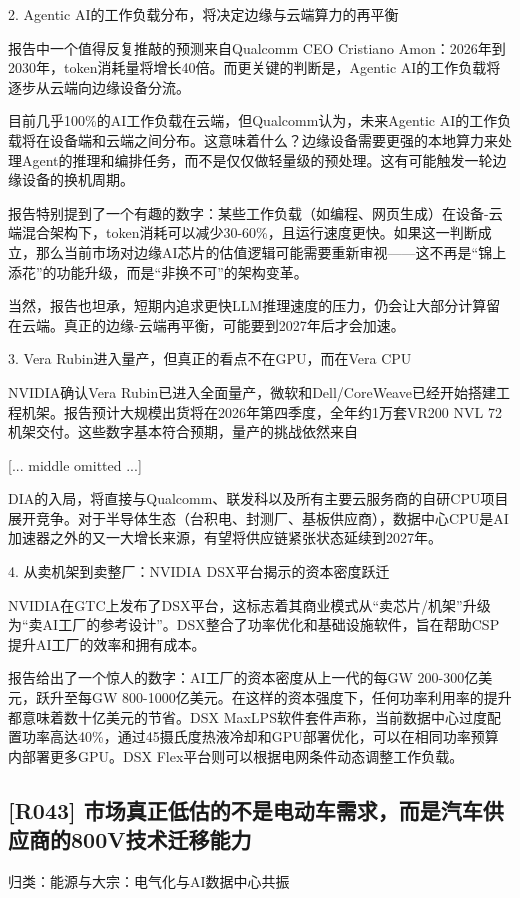 \documentclass[11pt]{ctexart}
\begin{document}
2. Agentic AI的工作负载分布，将决定边缘与云端算力的再平衡

报告中一个值得反复推敲的预测来自Qualcomm CEO Cristiano Amon：2026年到2030年，token消耗量将增长40倍。而更关键的判断是，Agentic AI的工作负载将逐步从云端向边缘设备分流。

目前几乎100\%的AI工作负载在云端，但Qualcomm认为，未来Agentic AI的工作负载将在设备端和云端之间分布。这意味着什么？边缘设备需要更强的本地算力来处理Agent的推理和编排任务，而不是仅仅做轻量级的预处理。这有可能触发一轮边缘设备的换机周期。

报告特别提到了一个有趣的数字：某些工作负载（如编程、网页生成）在设备-云端混合架构下，token消耗可以减少30-60\%，且运行速度更快。如果这一判断成立，那么当前市场对边缘AI芯片的估值逻辑可能需要重新审视——这不再是“锦上添花”的功能升级，而是“非换不可”的架构变革。

当然，报告也坦承，短期内追求更快LLM推理速度的压力，仍会让大部分计算留在云端。真正的边缘-云端再平衡，可能要到2027年后才会加速。

3. Vera Rubin进入量产，但真正的看点不在GPU，而在Vera CPU

NVIDIA确认Vera Rubin已进入全面量产，微软和Dell/CoreWeave已经开始搭建工程机架。报告预计大规模出货将在2026年第四季度，全年约1万套VR200 NVL 72机架交付。这些数字基本符合预期，量产的挑战依然来自

[... middle omitted ...]

DIA的入局，将直接与Qualcomm、联发科以及所有主要云服务商的自研CPU项目展开竞争。对于半导体生态（台积电、封测厂、基板供应商），数据中心CPU是AI加速器之外的又一大增长来源，有望将供应链紧张状态延续到2027年。

4. 从卖机架到卖整厂：NVIDIA DSX平台揭示的资本密度跃迁

NVIDIA在GTC上发布了DSX平台，这标志着其商业模式从“卖芯片/机架”升级为“卖AI工厂的参考设计”。DSX整合了功率优化和基础设施软件，旨在帮助CSP提升AI工厂的效率和拥有成本。

报告给出了一个惊人的数字：AI工厂的资本密度从上一代的每GW 200-300亿美元，跃升至每GW 800-1000亿美元。在这样的资本强度下，任何功率利用率的提升都意味着数十亿美元的节省。DSX MaxLPS软件套件声称，当前数据中心过度配置功率高达40\%，通过45摄氏度热液冷却和GPU部署优化，可以在相同功率预算内部署更多GPU。DSX Flex平台则可以根据电网条件动态调整工作负载。

\subsection{[R043] 市场真正低估的不是电动车需求，而是汽车供应商的800V技术迁移能力}
{\small\color{refgray}归类：能源与大宗：电气化与AI数据中心共振}
\end{document}

